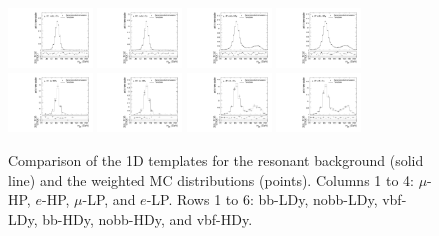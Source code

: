 \begin{figure}[htbp]
  \includegraphics[width=0.2\textwidth]{fig/analysis/templateVsReco_res_r0_MJ_mu_HP_nobb_HDy.pdf}
  \includegraphics[width=0.2\textwidth]{fig/analysis/templateVsReco_res_r0_MJ_e_HP_nobb_HDy.pdf}
  \includegraphics[width=0.2\textwidth]{fig/analysis/templateVsReco_res_r0_MJ_mu_LP_nobb_HDy.pdf}
  \includegraphics[width=0.2\textwidth]{fig/analysis/templateVsReco_res_r0_MJ_e_LP_nobb_HDy.pdf}\\
  \includegraphics[width=0.2\textwidth]{fig/analysis/templateVsReco_res_r0_MJ_mu_HP_vbf_HDy.pdf}
  \includegraphics[width=0.2\textwidth]{fig/analysis/templateVsReco_res_r0_MJ_e_HP_vbf_HDy.pdf}
  \includegraphics[width=0.2\textwidth]{fig/analysis/templateVsReco_res_r0_MJ_mu_LP_vbf_HDy.pdf}
  \includegraphics[width=0.2\textwidth]{fig/analysis/templateVsReco_res_r0_MJ_e_LP_vbf_HDy.pdf}\\
  \caption{
    Comparison of the 1D \MJ templates for the resonant background (solid line) and the weighted MC distributions (points).
    Columns 1 to 4: $\mu$-HP, $e$-HP, $\mu$-LP, and $e$-LP.
    Rows 1 to 6: bb-LDy, nobb-LDy, vbf-LDy, bb-HDy, nobb-HDy, and vbf-HDy.
  }
  \label{fig:1dtemplateVsReco_res_MJ_Run2}
\end{figure}

